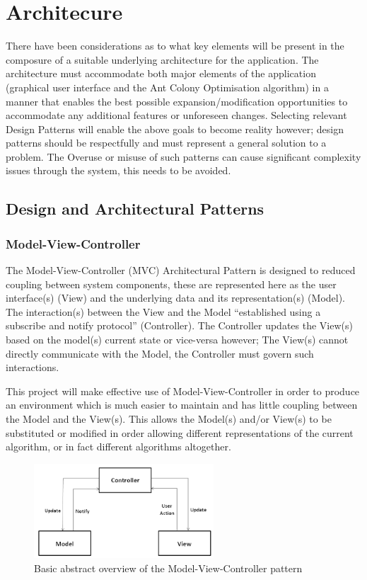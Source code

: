 \section{Architecure}

There have been considerations as to what key elements will be present in the composure of a suitable underlying architecture for the application. The architecture must accommodate both major elements of the application (graphical user interface and the Ant Colony Optimisation algorithm) in a manner that enables the best possible expansion/modification opportunities to accommodate any additional features or unforeseen changes. Selecting relevant Design Patterns will enable the above goals to become reality however; design patterns should be respectfully and must represent a general solution to a problem. The Overuse or misuse of such patterns can cause significant complexity issues through the system, this needs to be avoided. 

\subsection{Design and Architectural Patterns}

\subsubsection{Model-View-Controller}
\label{sssec:mvc}
\label{sec:patternsmvc}
The Model-View-Controller (MVC) Architectural Pattern is designed to reduced coupling between system components, these are represented here as the user interface(s) (View) and the underlying data and its representation(s) (Model). The interaction(s) between the View and the Model \enquote{established using a subscribe and notify protocol}\cite{gof:design:mvc} (Controller). The Controller updates the View(s) based on the model(s) current state or vice-versa however; The View(s) cannot directly communicate with the Model, the Controller must govern such interactions.

This project will make effective use of Model-View-Controller in order to produce an environment which is much easier to maintain and has little coupling between the Model and the View(s). This allows the Model(s) and/or View(s) to be substituted or modified in order allowing different representations of the current algorithm, or in fact different algorithms altogether. 

\begin{figure}[h]
\centering
\includegraphics[width=0.6\textwidth]{Images/design/mvc}
\caption{Basic abstract overview of the Model-View-Controller pattern}
\end{figure}

